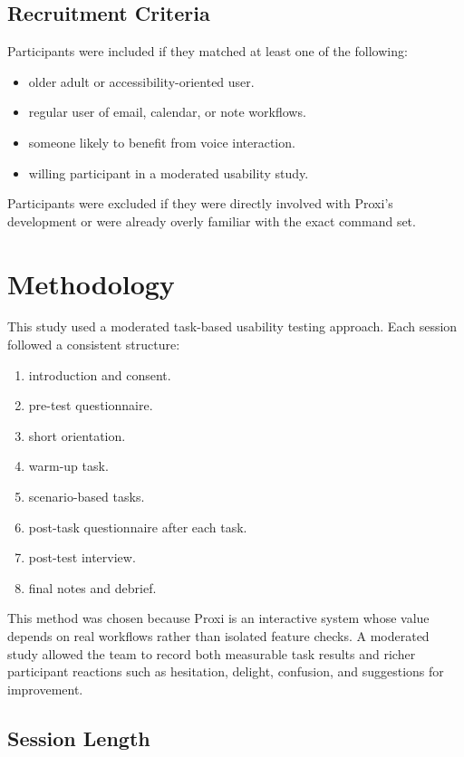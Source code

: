 \documentclass[12pt, titlepage]{article}
\begin{document}
\subsection{Recruitment Criteria}

Participants were included if they matched at least one of the
following:
\begin{itemize}
    \item older adult or accessibility-oriented user.
    \item regular user of email, calendar, or note workflows.
    \item someone likely to benefit from voice interaction.
    \item willing participant in a moderated usability study.
\end{itemize}

Participants were excluded if they were directly involved with Proxi's
development or were already overly familiar with the exact command set.

\section{Methodology}

This study used a moderated task-based usability testing approach. Each
session followed a consistent structure:
\begin{enumerate}[label=\arabic*.]
    \item introduction and consent.
    \item pre-test questionnaire.
    \item short orientation.
    \item warm-up task.
    \item scenario-based tasks.
    \item post-task questionnaire after each task.
    \item post-test interview.
    \item final notes and debrief.
\end{enumerate}

This method was chosen because Proxi is an interactive system whose
value depends on real workflows rather than isolated feature checks. A
moderated study allowed the team to record both measurable task results
and richer participant reactions such as hesitation, delight,
confusion, and suggestions for improvement.

\subsection{Session Length}
\end{document}
